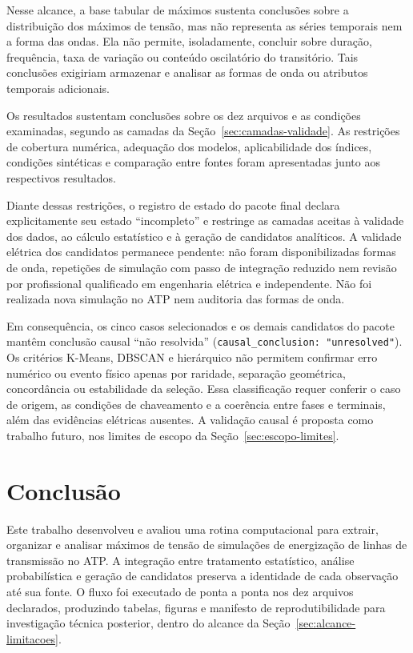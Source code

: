 \documentclass[
	12pt,				%
	openright,			%
	oneside,			%
	a4paper,			%
	chapter=TITLE,		%
	section=TITLE,		%
	subsection=TITLE,	%
	subsubsection=TITLE,%
	english,			%
	brazilian			%
	]{abntex2}
\theoremstyle{definition}
\begin{document}
Nesse alcance, a base tabular de máximos sustenta conclusões sobre a
distribuição dos máximos de
tensão, mas não representa as séries temporais nem a forma das ondas. Ela não
permite, isoladamente, concluir sobre duração, frequência, taxa de variação ou
conteúdo oscilatório do transitório. Tais conclusões exigiriam armazenar e
analisar as formas de onda ou atributos temporais adicionais.

Os resultados sustentam conclusões sobre os dez arquivos e as condições
examinadas, segundo as camadas da Seção~\ref{sec:camadas-validade}. As
restrições de cobertura numérica, adequação dos modelos, aplicabilidade dos
índices, condições sintéticas e comparação entre fontes foram apresentadas
junto aos respectivos resultados.

Diante dessas restrições, o registro de estado do pacote final declara
explicitamente seu estado
``incompleto'' e restringe
as camadas aceitas à validade dos dados, ao cálculo estatístico e à geração
de candidatos analíticos. A validade elétrica dos candidatos permanece
pendente: não foram disponibilizadas formas de onda, repetições de simulação
com passo de integração reduzido nem revisão por profissional qualificado
em engenharia elétrica e independente. Não foi realizada nova simulação no ATP nem
auditoria das formas de onda.

Em consequência, os cinco casos selecionados e os demais candidatos do
pacote mantêm conclusão causal ``não resolvida''
(\texttt{causal\_conclusion: "unresolved"}). Os critérios K-Means, DBSCAN e hierárquico não permitem confirmar erro numérico ou evento físico apenas por
raridade, separação geométrica, concordância ou estabilidade da seleção.
Essa classificação requer conferir o caso de origem, as condições de
chaveamento e a coerência entre fases e terminais, além das evidências
elétricas ausentes. A validação causal é proposta como trabalho futuro,
nos limites de escopo da Seção~\ref{sec:escopo-limites}.

\chapter{Conclusão}
\label{chap:conclusao}

Este trabalho desenvolveu e avaliou uma rotina computacional para extrair,
organizar e analisar máximos de tensão de simulações de energização de linhas
de transmissão no ATP. A integração entre tratamento estatístico, análise
probabilística e geração de candidatos preserva a identidade de cada
observação até sua fonte. O fluxo foi executado de ponta a ponta nos dez
arquivos declarados, produzindo tabelas, figuras e manifesto de
reprodutibilidade para investigação técnica posterior, dentro do alcance da
Seção~\ref{sec:alcance-limitacoes}.
\end{document}
